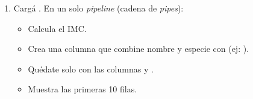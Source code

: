 \documentclass[8pt]{beamer}
\begin{document}
\begin{frame}[fragile]
	\begin{enumerate}[start = 30]
		\item Carg\'a . En un solo \textit{pipeline} (cadena de \textit{pipes}):
		\begin{itemize}
			\item Calcula el IMC.
			\item Crea una columna  que combine nombre y especie con  (ej:  ).
			\item Quédate solo con las columnas  y .
			\item Muestra las primeras 10 filas.
		\end{itemize}
	\end{enumerate}
\end{frame}
\end{document}
